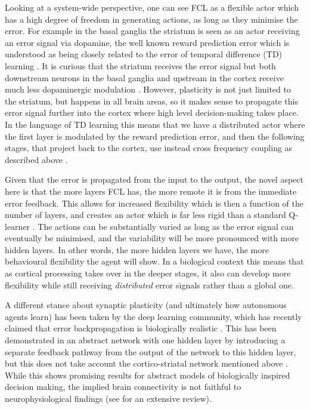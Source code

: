 \documentclass[Afour,sageh,times]{sagej}
\begin{document}
Looking at a system-wide perspective, one can see FCL as a flexible
actor which has a high degree of freedom in generating actions, as long as they
minimise the error. For example in the basal ganglia the striatum is
seen as an actor receiving an error signal via dopamine, the well known
reward prediction error \cite{Schultz97} which is understood as being
closely related to the error of temporal difference (TD) learning
\cite{gurney98:_basal_gangl_action_selec_devic}. It is curious that
the striatum receives the error signal but both downstream neurons in
the basal ganglia and upstream in the cortex receive much less
dopaminergic modulation \cite{Beckstead1979}. However, plasticity is
not just limited to the striatum, but happens in all brain areas, so
it makes sense to propagate this error signal further into the cortex
\cite{Groenewegen1993} where high level decision-making takes place.
In the language of TD learning \cite{Sutton87} this means that we
have a distributed actor where the first layer is modulated by the
reward prediction error, and then the following stages, that project
back to the cortex, use instead cross frequency coupling
as described above \cite{Lipski2017}.

Given that the error is propagated from the input to the output, the
novel aspect here is that the more layers FCL has, the more remote it
is from the immediate error feedback. This allows for increased
flexibility which is then a function of the number of layers, and
creates an actor which is far less rigid than a standard Q-learner
\cite{Dayan1992}. The actions can be substantially varied as long as
the error signal can eventually be minimised, and the variability will
be more pronounced with more hidden layers. In other words, the more
hidden layers we have, the more behavioural flexibility the agent will
show. In a biological context this means that as cortical processing
takes over in the deeper stages, it also can develop more flexibility
while still receiving \textsl{distributed} error signals rather than a
global one.

A different stance about synaptic plasticity (and ultimately how
autonomous agents learn) has been taken by the deep learning
community, which has recently claimed that error backpropagation is
biologically realistic \cite{Lillicrap2016,Roelfsema2018}. This has
been demonstrated in an abstract network with one hidden layer by
introducing a separate feedback pathway from the output of the network
to this hidden layer, but this does not take account the
cortico-striatal network mentioned above \cite{haber95}. While this
shows promising results for abstract models of biologically inspired
decision making, the implied brain connectivity is not faithful to
neurophysiological findings (see \cite{berthoud04} for an extensive
review).
\end{document}
